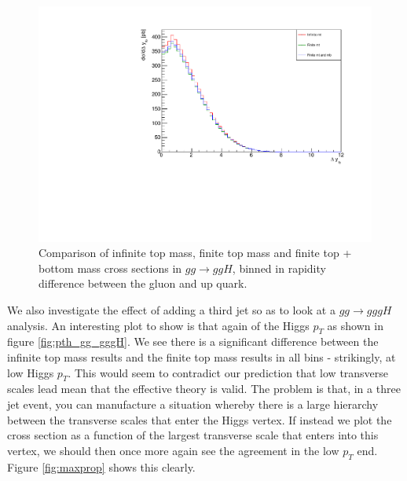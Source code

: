 \begin{figure}[H]
\centering
\includegraphics[scale=0.7]{Images/ydiff_gg.pdf}
\caption{Comparison of infinite top mass, finite top mass and finite top + bottom mass cross sections in $gg \to ggH$, binned in rapidity difference between the gluon and up quark.}
\label{fig:ydiff_gg}
\end{figure}
We also investigate the effect of adding a third jet so as to look at a $gg \to gggH$ analysis. An interesting plot to show is that again of the Higgs $p_T$ as shown in figure \ref{fig:pth_gg_gggH}. We see there is a significant difference between the infinite top mass results and the finite top mass results in all bins - strikingly, at low Higgs $p_T$. This would seem to contradict our prediction that low transverse scales lead mean that the effective theory is valid. The problem is that, in a three jet event, you can manufacture a situation whereby there is a large hierarchy between the transverse scales that enter the Higgs vertex. If instead we plot the cross section as a function of the largest transverse scale that enters into this vertex, we should then once more again see the agreement in the low $p_T$ end. Figure \ref{fig:maxprop} shows this clearly. %

